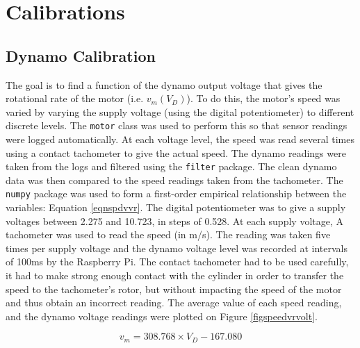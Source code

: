 \documentclass[twoside,a4]{report}
\def\br{\newline \newline \noindent}
\begin{document}
	
	\section{Calibrations}
	
	\subsection*{Dynamo Calibration}
	The goal is to find a function of the dynamo output voltage that gives the rotational rate of the motor (i.e. \(v_m ({V_D})\)). To do this, the motor's speed was varied by varying the supply voltage (using the digital potentiometer) to different discrete levels. The \texttt{motor} class was used to perform this so that sensor readings were logged automatically. At each voltage level, the speed was read several times using a contact tachometer to give the actual speed. The dynamo readings were taken from the logs and filtered using the \texttt{filter} package. The clean dynamo data was then compared to the speed readings taken from the tachometer. The \texttt{numpy} package was used to form a first-order empirical relationship between the variables: Equation \ref{eqnspdvvr}. 
	\br
	The digital potentiometer was to give a supply voltages between 2.275 and 10.723, in steps of 0.528. At each supply voltage, A tachometer was used to read the speed (in m/s). The reading was taken five times per supply voltage and the dynamo voltage level was recorded at intervals of 100ms by the Raspberry Pi. The contact tachometer had to be used carefully, it had to make strong enough contact with the cylinder in order to transfer the speed to the tachometer's rotor, but without impacting the speed of the motor and thus obtain an incorrect reading. The average value of each speed reading, and the dynamo voltage readings were plotted on Figure \ref{figspeedvrvolt}.
	
	\begin{equation}
	v_m = 308.768 \times {V_D} - 167.080
	\label{eqnspdvvr}
	\end{equation}
	
\end{document}
